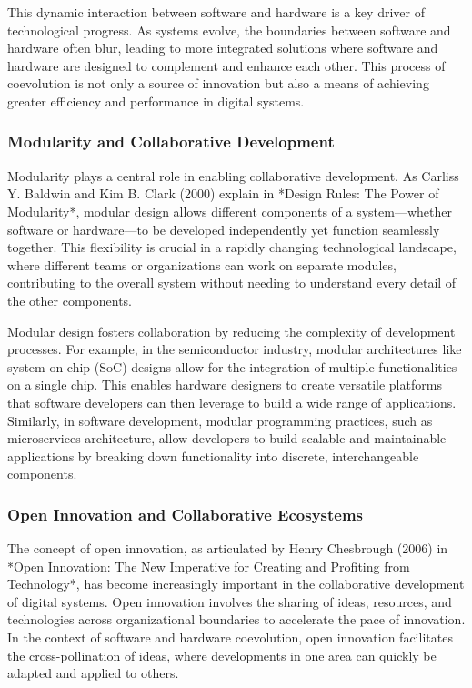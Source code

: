 \documentclass[12pt,twoside]{article}
\begin{document}
This dynamic interaction between software and hardware is a key driver of technological progress. As systems evolve, the boundaries between software and hardware often blur, leading to more integrated solutions where software and hardware are designed to complement and enhance each other. This process of coevolution is not only a source of innovation but also a means of achieving greater efficiency and performance in digital systems.

\subsubsection{Modularity and Collaborative Development}

Modularity plays a central role in enabling collaborative development. As Carliss Y. Baldwin and Kim B. Clark (2000) explain in *Design Rules: The Power of Modularity*, modular design allows different components of a system—whether software or hardware—to be developed independently yet function seamlessly together. This flexibility is crucial in a rapidly changing technological landscape, where different teams or organizations can work on separate modules, contributing to the overall system without needing to understand every detail of the other components.

Modular design fosters collaboration by reducing the complexity of development processes. For example, in the semiconductor industry, modular architectures like system-on-chip (SoC) designs allow for the integration of multiple functionalities on a single chip. This enables hardware designers to create versatile platforms that software developers can then leverage to build a wide range of applications. Similarly, in software development, modular programming practices, such as microservices architecture, allow developers to build scalable and maintainable applications by breaking down functionality into discrete, interchangeable components.

\subsubsection{Open Innovation and Collaborative Ecosystems}

The concept of open innovation, as articulated by Henry Chesbrough (2006) in *Open Innovation: The New Imperative for Creating and Profiting from Technology*, has become increasingly important in the collaborative development of digital systems. Open innovation involves the sharing of ideas, resources, and technologies across organizational boundaries to accelerate the pace of innovation. In the context of software and hardware coevolution, open innovation facilitates the cross-pollination of ideas, where developments in one area can quickly be adapted and applied to others.
\end{document}
